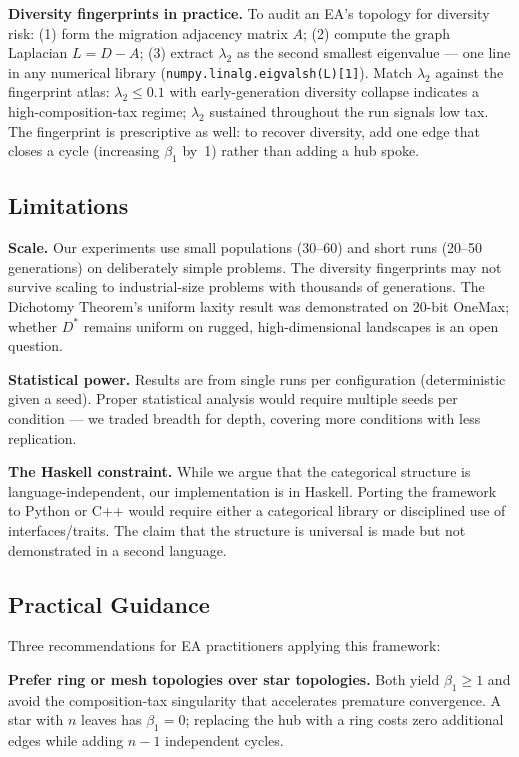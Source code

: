 \documentclass[10pt]{article}
\begin{document}
\textbf{Diversity fingerprints in practice.} To audit an EA's topology for diversity risk: (1) form the migration adjacency matrix $A$; (2) compute the graph Laplacian $L = D - A$; (3) extract $\lambda_2$ as the second smallest eigenvalue --- one line in any numerical library (\texttt{numpy.linalg.eigvalsh(L)[1]}). Match $\lambda_2$ against the fingerprint atlas: $\lambda_2 \leq 0.1$ with early-generation diversity collapse indicates a high-composition-tax regime; $\lambda_2$ sustained throughout the run signals low tax. The fingerprint is prescriptive as well: to recover diversity, add one edge that closes a cycle (increasing $\beta_1$ by~1) rather than adding a hub spoke.

\subsection{Limitations}

\textbf{Scale.} Our experiments use small populations (30--60) and short runs (20--50 generations) on deliberately simple problems. The diversity fingerprints may not survive scaling to industrial-size problems with thousands of generations. The Dichotomy Theorem's uniform laxity result was demonstrated on 20-bit OneMax; whether $D^*$ remains uniform on rugged, high-dimensional landscapes is an open question.

\textbf{Statistical power.} Results are from single runs per configuration (deterministic given a seed). Proper statistical analysis would require multiple seeds per condition --- we traded breadth for depth, covering more conditions with less replication.

\textbf{The Haskell constraint.} While we argue that the categorical structure is language-independent, our implementation is in Haskell. Porting the framework to Python or C++ would require either a categorical library or disciplined use of interfaces/traits. The claim that the structure is universal is made but not demonstrated in a second language.

\subsection{Practical Guidance}

Three recommendations for EA practitioners applying this framework:

\textbf{Prefer ring or mesh topologies over star topologies.} Both yield $\beta_1 \geq 1$ and avoid the composition-tax singularity that accelerates premature convergence. A star with $n$ leaves has $\beta_1 = 0$; replacing the hub with a ring costs zero additional edges while adding $n-1$ independent cycles.
\end{document}
